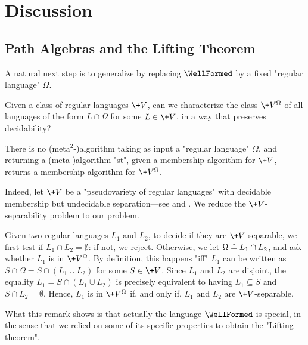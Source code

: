 \section{Discussion}
\label{sec:algebra-discussion}

\subsection{Path Algebras and the Lifting Theorem}

A natural next step is to generalize  by replacing
$\WellFormed$ by a fixed "regular language" $\Omega$.

\begin{question}
	Given a class of regular languages $\+V$, can we characterize the class $\+V^\Omega$
	of all languages of the form $L \cap \Omega$ for some $L \in \+V$, in a way that preserves decidability?
\end{question}

\begin{remark}
	\label{rk:no-algo-lifting}
	There is no (meta$^2$-)algorithm taking as input a "regular language" $\Omega$,
	and returning a (meta-)algorithm "st", given
	a membership algorithm for $\+V$, returns a membership algorithm
	for $\+V^\Omega$.

	Indeed, let $\+V$ be a "pseudovariety of regular languages" with
	decidable membership but undecidable separation---see
	\cite[Corollary 1.6, p.~478]{Rhode2011Pointlike} and .
	We reduce the $\+V$-separability problem to our problem.

	Given two regular languages $L_1$ and $L_2$, to decide if they are $\+V$-separable,
	we first test if $L_1 \cap L_2 = \emptyset$: if not, we reject.
	Otherwise, we let $\Omega \mathrel{\hat{=}} L_1 \cap L_2$, and ask whether
	$L_1$ is in $\+V^\Omega$.
	By definition, this happens "iff" $L_1$ can be written as
	$S \cap \Omega = S \cap (L_1 \cup L_2)$ for some $S \in \+V$.
	Since $L_1$ and $L_2$ are disjoint, the equality $L_1 = S \cap (L_1 \cup L_2)$
	is precisely equivalent to having $L_1 \subseteq S$ and $S \cap L_2 = \emptyset$.
	Hence, $L_1$ is in $\+V^\Omega$ if, and only if, $L_1$ and $L_2$ are $\+V$-separable.
\end{remark}

What this remark shows is that actually the language $\WellFormed$ is special,
in the sense that we relied on some of its specific properties to obtain the "Lifting theorem".

